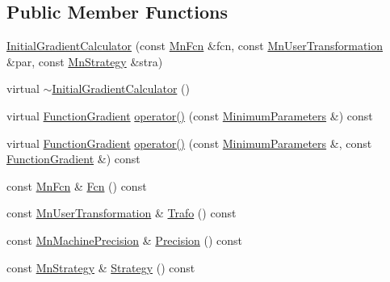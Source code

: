 \subsection*{Public Member Functions}
\begin{DoxyCompactItemize}
\item 
\mbox{\hyperlink{classROOT_1_1Minuit2_1_1InitialGradientCalculator_a25d1c68548c1ada8fa395a3c684a61ec}{Initial\+Gradient\+Calculator}} (const \mbox{\hyperlink{classROOT_1_1Minuit2_1_1MnFcn}{Mn\+Fcn}} \&fcn, const \mbox{\hyperlink{classROOT_1_1Minuit2_1_1MnUserTransformation}{Mn\+User\+Transformation}} \&par, const \mbox{\hyperlink{classROOT_1_1Minuit2_1_1MnStrategy}{Mn\+Strategy}} \&stra)
\item 
virtual \mbox{\hyperlink{classROOT_1_1Minuit2_1_1InitialGradientCalculator_a5d0dc43f0bc924799d29f6640aae863f}{$\sim$\+Initial\+Gradient\+Calculator}} ()
\item 
virtual \mbox{\hyperlink{classROOT_1_1Minuit2_1_1FunctionGradient}{Function\+Gradient}} \mbox{\hyperlink{classROOT_1_1Minuit2_1_1InitialGradientCalculator_afae3b02315c3ed44cdd94dff4bd53462}{operator()}} (const \mbox{\hyperlink{classROOT_1_1Minuit2_1_1MinimumParameters}{Minimum\+Parameters}} \&) const
\item 
virtual \mbox{\hyperlink{classROOT_1_1Minuit2_1_1FunctionGradient}{Function\+Gradient}} \mbox{\hyperlink{classROOT_1_1Minuit2_1_1InitialGradientCalculator_aca07af1a7ff9e8525c0d4d2d3633f9c5}{operator()}} (const \mbox{\hyperlink{classROOT_1_1Minuit2_1_1MinimumParameters}{Minimum\+Parameters}} \&, const \mbox{\hyperlink{classROOT_1_1Minuit2_1_1FunctionGradient}{Function\+Gradient}} \&) const
\item 
const \mbox{\hyperlink{classROOT_1_1Minuit2_1_1MnFcn}{Mn\+Fcn}} \& \mbox{\hyperlink{classROOT_1_1Minuit2_1_1InitialGradientCalculator_ab8c917922374b40c93ba5821f31d72e9}{Fcn}} () const
\item 
const \mbox{\hyperlink{classROOT_1_1Minuit2_1_1MnUserTransformation}{Mn\+User\+Transformation}} \& \mbox{\hyperlink{classROOT_1_1Minuit2_1_1InitialGradientCalculator_aba7febb81b50fd961a9f7f754413a5c9}{Trafo}} () const
\item 
const \mbox{\hyperlink{classROOT_1_1Minuit2_1_1MnMachinePrecision}{Mn\+Machine\+Precision}} \& \mbox{\hyperlink{classROOT_1_1Minuit2_1_1InitialGradientCalculator_a7b85d42dfbb0581c4cb5f8ad47a798a0}{Precision}} () const
\item 
const \mbox{\hyperlink{classROOT_1_1Minuit2_1_1MnStrategy}{Mn\+Strategy}} \& \mbox{\hyperlink{classROOT_1_1Minuit2_1_1InitialGradientCalculator_ac8fb719893c5d2959ba9d784c8c2e887}{Strategy}} () const

\end{DoxyCompactItemize}
